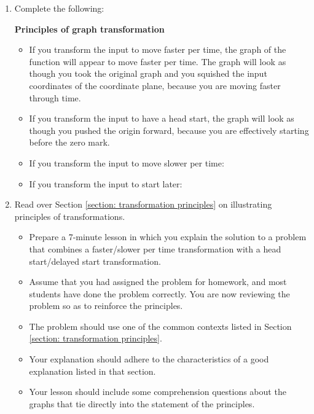 \documentclass[11pt]{article}
\theoremstyle{definition}
\begin{document}
\begin{enumerate}[resume]
\item Complete the following:
	\begin{mdframed}
{\bf Principles of graph transformation} 
	\begin{itemize}
	\item If you transform the input to move faster per time, the graph of the function will appear to move faster per time. The graph will look as though you took the original graph and you squished the input coordinates of the coordinate plane, because you are moving faster through time. 
	\item If you transform the input to have a head start, the graph will look as though you pushed the origin forward, because you are effectively starting before the zero mark.
	\item If you transform the input to move slower per time:
	
	\bigskip
	
	\item If you transform the input to start later:
	
	\bigskip\bigskip
	
	\end{itemize}
	\end{mdframed}
	
\item Read over Section \ref{section: transformation principles} on illustrating principles of transformations. 

\begin{itemize} 
\item Prepare a 7-minute lesson in which you explain the solution to a problem that combines a faster/slower per time transformation with a head start/delayed start transformation. 

\item Assume that you had assigned the problem for homework, and most students have done the problem correctly. You are now reviewing the problem so as to reinforce the principles.

\item The problem should use one of the common contexts listed in Section \ref{section: transformation principles}.

\item Your explanation should adhere to the characteristics of a good explanation listed in that section. 

\item Your lesson should include some comprehension questions about the graphs that tie directly into the statement of the principles.

\end{itemize}
\end{enumerate} 
\end{document}
